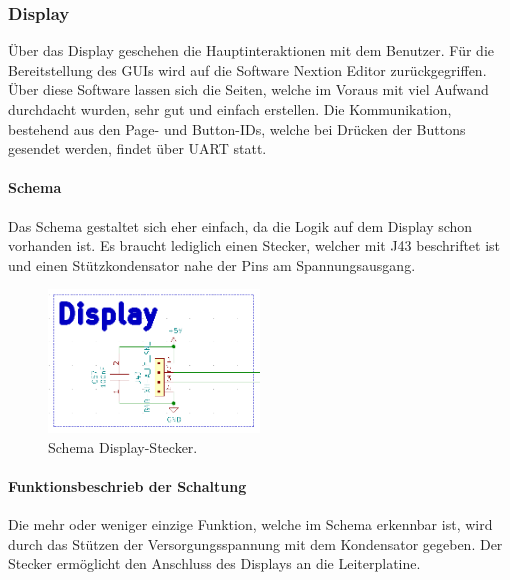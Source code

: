 \subsubsection{Display}
\label{subsubsec:Display}

Über das Display geschehen die Hauptinteraktionen mit dem Benutzer. Für die Bereitstellung des GUIs wird auf die Software Nextion Editor zurückgegriffen. Über diese Software lassen sich die Seiten, welche im Voraus mit viel Aufwand durchdacht wurden, sehr gut und einfach erstellen. Die Kommunikation, bestehend aus den Page- und Button-IDs, welche bei Drücken der Buttons gesendet werden, findet über UART statt. \cite{zhou_nextion_nodate}

\paragraph{Schema}\mbox{}

Das Schema gestaltet sich eher einfach, da die Logik auf dem Display schon vorhanden ist. Es braucht lediglich einen Stecker, welcher mit J43 beschriftet ist und einen Stützkondensator nahe der Pins am Spannungsausgang.

\begin{figure}[h!]
	\centering
	\includegraphics[width=0.5\textwidth]{graphics/Schema_Display}
	\caption{Schema Display-Stecker.}
	\label{fig:Schema_Display}
\end{figure}

\paragraph{Funktionsbeschrieb der Schaltung}\mbox{}

Die mehr oder weniger einzige Funktion, welche im Schema erkennbar ist, wird durch das Stützen der Versorgungsspannung mit dem Kondensator gegeben. Der Stecker ermöglicht den Anschluss des Displays an die Leiterplatine.